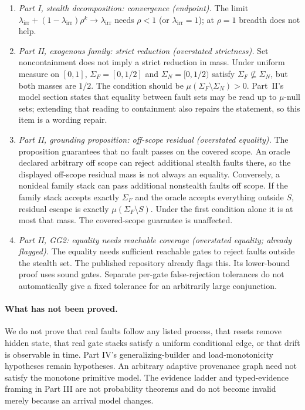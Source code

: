 \documentclass[11pt]{article}
\theoremstyle{definition}
\theoremstyle{remark}
\begin{document}
\begin{enumerate}[leftmargin=*,itemsep=2pt]
\item \emph{Part I, stealth decomposition: convergence (endpoint).} The limit
$\lambda_{\mathrm{irr}}+(1-\lambda_{\mathrm{irr}})\rho^k\to\lambda_{\mathrm{irr}}$ needs $\rho<1$
(or $\lambda_{\mathrm{irr}}=1$); at $\rho=1$ breadth does not help.

\item \emph{Part II, exogenous family: strict reduction (overstated strictness).} Set
noncontainment does not imply a strict reduction in mass. Under uniform measure on $[0,1]$,
$\Sigma_F=[0,1/2]$ and $\Sigma_N=[0,1/2)$ satisfy $\Sigma_F\not\subseteq\Sigma_N$, but both masses
are $1/2$. The condition should be $\mu(\Sigma_F\setminus\Sigma_N)>0$. Part~II's model section states that equality between fault sets may be read up to $\mu$-null
sets; extending that reading to containment also repairs the statement, so this item is a wording
repair.

\item \emph{Part II, grounding proposition: off-scope residual (overstated equality).} The
proposition guarantees that no fault passes on the covered scope. An oracle declared arbitrary off
scope can reject additional stealth faults there, so the displayed off-scope residual mass is not
always an equality. Conversely, a nonideal family stack can pass additional nonstealth faults off
scope. If the family stack accepts exactly $\Sigma_F$ and the oracle accepts everything outside
$S$, residual escape is exactly $\mu(\Sigma_F\setminus S)$. Under the first condition alone it is
at most that mass. The covered-scope guarantee is unaffected.

\item \emph{Part II, GG2: equality needs reachable coverage (overstated equality; already flagged).}
The equality needs sufficient reachable gates to reject faults outside the stealth set. The
published repository already flags this. Its lower-bound proof uses sound gates. Separate
per-gate false-rejection tolerances do not automatically give a fixed tolerance for an
arbitrarily large conjunction.
\end{enumerate}

\paragraph{What has not been proved.}
We do not prove that real faults follow any listed process, that resets remove hidden state,
that real gate stacks satisfy a uniform conditional edge, or that drift is observable in time.
Part IV's generalizing-builder and load-monotonicity hypotheses remain hypotheses.
An arbitrary adaptive provenance graph need not satisfy the monotone primitive model.
The evidence ladder and typed-evidence framing in Part III are not probability theorems and
do not become invalid merely because an arrival model changes.
\end{document}

